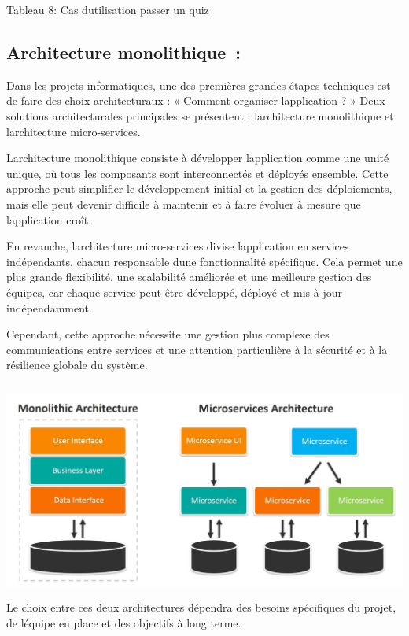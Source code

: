 \documentclass[12pt,a4paper,twoside]{report}
\begin{document}
\protect\hypertarget{_Toc203823482}{}{}Tableau 8: Cas
d\textquotesingle utilisation passer un quiz

\hypertarget{architecture-monolithique}{%
\subsection{Architecture
monolithique~:}\label{architecture-monolithique}}

Dans les projets informatiques, une des premières grandes étapes
techniques est de faire des choix architecturaux : « Comment organiser
l\textquotesingle application ? » Deux solutions architecturales
principales se présentent : l\textquotesingle architecture monolithique
et l\textquotesingle architecture micro-services.

L\textquotesingle architecture monolithique consiste à développer
l\textquotesingle application comme une unité unique, où tous les
composants sont interconnectés et déployés ensemble. Cette approche peut
simplifier le développement initial et la gestion des déploiements, mais
elle peut devenir difficile à maintenir et à faire évoluer à mesure que
l\textquotesingle application croît.

En revanche, l\textquotesingle architecture micro-services divise
l\textquotesingle application en services indépendants, chacun
responsable d\textquotesingle une fonctionnalité spécifique. Cela permet
une plus grande flexibilité, une scalabilité améliorée et une meilleure
gestion des équipes, car chaque service peut être développé, déployé et
mis à jour indépendamment.

Cependant, cette approche nécessite une gestion plus complexe des
communications entre services et une attention particulière à la
sécurité et à la résilience globale du système.

\includegraphics[width=5.81739in,height=2.81077in]{latex_media/media/image15.jpeg}Le
choix entre ces deux architectures dépendra des besoins spécifiques du
projet, de l\textquotesingle équipe en place et des objectifs à long
terme.
\end{document}
